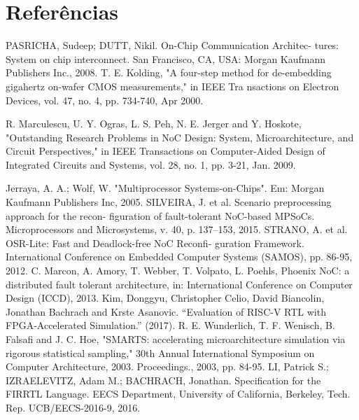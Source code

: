 \documentclass[conference]{IEEEtran}
\begin{document}
	
	\section*{Referências}
	\renewcommand{\section}[2]{}
	
	\begin{thebibliography}{00}
		  PASRICHA, Sudeep; DUTT, Nikil. On-Chip Communication Architec-
		tures: System on chip interconnect. San Francisco, CA, USA: Morgan Kaufmann Publishers Inc., 2008.
		T. E. Kolding, "A four-step method for de-embedding gigahertz on-wafer CMOS measurements," in IEEE Tra
		nsactions on Electron Devices, vol. 47, no. 4, pp. 734-740, Apr 2000.
		
		R. Marculescu, U. Y. Ogras, L. S. Peh, N. E. Jerger and Y. Hoskote, "Outstanding Research Problems in NoC Design: System, Microarchitecture, and Circuit Perspectives," in IEEE Transactions on Computer-Aided Design of Integrated Circuits and Systems, vol. 28, no. 1, pp. 3-21, Jan. 2009.
		
		 Jerraya, A. A.; Wolf, W. "Multiprocessor Systems-on-Chips". Em: Morgan
		Kaufmann Publishers Inc, 2005.
		 SILVEIRA, J. et al. Scenario preprocessing approach for the recon-
		figuration of fault-tolerant NoC-based MPSoCs. Microprocessors and
		Microsystems, v. 40, p. 137–153, 2015.
		  STRANO, A. et al. OSR-Lite: Fast and Deadlock-free NoC Reconfi-
		guration Framework. International Conference on Embedded Computer
		Systems (SAMOS), pp. 86-95, 2012.
		 C. Marcon, A. Amory, T. Webber, T. Volpato, L. Poehls, Phoenix NoC:
		a distributed fault tolerant architecture, in: International Conference on
		Computer Design (ICCD), 2013.
		 Kim, Donggyu, Christopher Celio, David Biancolin, Jonathan Bachrach and Krste Asanovic. “Evaluation of RISC-V RTL with FPGA-Accelerated Simulation.” (2017).
		 R. E. Wunderlich, T. F. Wenisch, B. Falsafi and J. C. Hoe, "SMARTS: accelerating microarchitecture simulation via rigorous statistical sampling," 30th Annual International Symposium on Computer Architecture, 2003. Proceedings., 2003, pp. 84-95.
		 LI, Patrick S.; IZRAELEVITZ, Adam M.; BACHRACH, Jonathan. Specification for the FIRRTL Language. EECS Department, University of California, Berkeley, Tech. Rep. UCB/EECS-2016-9, 2016.
		
	\end{thebibliography}
	
	
\end{document}

